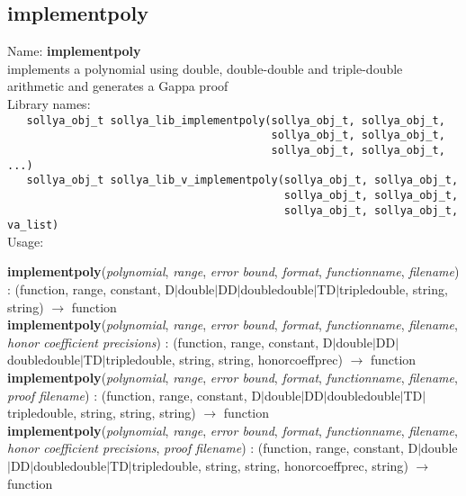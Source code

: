 \subsection{implementpoly}
\label{labimplementpoly}
\noindent Name: \textbf{implementpoly}\\
\phantom{aaa}implements a polynomial using double, double-double and triple-double arithmetic and generates a Gappa proof\\[0.2cm]
\noindent Library names:\\
\verb|   sollya_obj_t sollya_lib_implementpoly(sollya_obj_t, sollya_obj_t,|\\
\verb|                                         sollya_obj_t, sollya_obj_t,|\\
\verb|                                         sollya_obj_t, sollya_obj_t, ...)|\\
\verb|   sollya_obj_t sollya_lib_v_implementpoly(sollya_obj_t, sollya_obj_t,|\\
\verb|                                           sollya_obj_t, sollya_obj_t,|\\
\verb|                                           sollya_obj_t, sollya_obj_t, va_list)|\\[0.2cm]
\noindent Usage: 
\begin{center}
\textbf{implementpoly}(\emph{polynomial}, \emph{range}, \emph{error bound}, \emph{format}, \emph{functionname}, \emph{filename}) : (\textsf{function}, \textsf{range}, \textsf{constant}, \textsf{D$|$double$|$DD$|$doubledouble$|$TD$|$tripledouble}, \textsf{string}, \textsf{string}) $\rightarrow$ \textsf{function}\\
\textbf{implementpoly}(\emph{polynomial}, \emph{range}, \emph{error bound}, \emph{format}, \emph{functionname}, \emph{filename}, \emph{honor coefficient precisions}) : (\textsf{function}, \textsf{range}, \textsf{constant}, \textsf{D$|$double$|$DD$|$doubledouble$|$TD$|$tripledouble}, \textsf{string}, \textsf{string}, \textsf{honorcoeffprec}) $\rightarrow$ \textsf{function}\\
\textbf{implementpoly}(\emph{polynomial}, \emph{range}, \emph{error bound}, \emph{format}, \emph{functionname}, \emph{filename}, \emph{proof filename}) : (\textsf{function}, \textsf{range}, \textsf{constant}, \textsf{D$|$double$|$DD$|$doubledouble$|$TD$|$tripledouble}, \textsf{string}, \textsf{string}, \textsf{string}) $\rightarrow$ \textsf{function}\\
\textbf{implementpoly}(\emph{polynomial}, \emph{range}, \emph{error bound}, \emph{format}, \emph{functionname}, \emph{filename}, \emph{honor coefficient precisions}, \emph{proof filename}) : (\textsf{function}, \textsf{range}, \textsf{constant}, \textsf{D$|$double$|$DD$|$doubledouble$|$TD$|$tripledouble}, \textsf{string}, \textsf{string}, \textsf{honorcoeffprec}, \textsf{string}) $\rightarrow$ \textsf{function}\\
\end{center}
